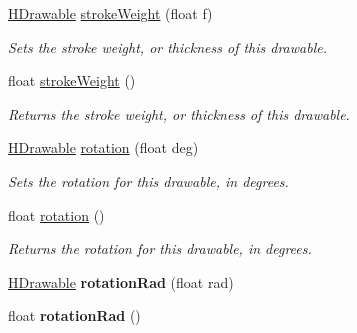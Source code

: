 \begin{DoxyCompactItemize}
\hyperlink{classhype_1_1drawable_1_1_h_drawable}{H\-Drawable} \hyperlink{classhype_1_1drawable_1_1_h_drawable_a35e86b46f7a87e0caf41b005d9579bbb}{stroke\-Weight} (float f)
\begin{DoxyCompactList}\small\item\em Sets the stroke weight, or thickness of this drawable. \end{DoxyCompactList}\item 
float \hyperlink{classhype_1_1drawable_1_1_h_drawable_addcad70b22c1df45f52562394e4db624}{stroke\-Weight} ()
\begin{DoxyCompactList}\small\item\em Returns the stroke weight, or thickness of this drawable. \end{DoxyCompactList}\item 
\hyperlink{classhype_1_1drawable_1_1_h_drawable}{H\-Drawable} \hyperlink{classhype_1_1drawable_1_1_h_drawable_a65ca80c8327fd73cfb6c459d5fe03032}{rotation} (float deg)
\begin{DoxyCompactList}\small\item\em Sets the rotation for this drawable, in degrees. \end{DoxyCompactList}\item 
float \hyperlink{classhype_1_1drawable_1_1_h_drawable_a8eb40202a2ff44b5cf530240bd390be4}{rotation} ()
\begin{DoxyCompactList}\small\item\em Returns the rotation for this drawable, in degrees. \end{DoxyCompactList}\item 
\hypertarget{classhype_1_1drawable_1_1_h_drawable_a0e4d63f112b6904b084c2f8eca8757df}{\hyperlink{classhype_1_1drawable_1_1_h_drawable}{H\-Drawable} {\bfseries rotation\-Rad} (float rad)}\label{classhype_1_1drawable_1_1_h_drawable_a0e4d63f112b6904b084c2f8eca8757df}

\item 
\hypertarget{classhype_1_1drawable_1_1_h_drawable_a11f92096fcd9835477a861e7d60c9975}{float {\bfseries rotation\-Rad} ()}\label{classhype_1_1drawable_1_1_h_drawable_a11f92096fcd9835477a861e7d60c9975}


\end{DoxyCompactItemize}

